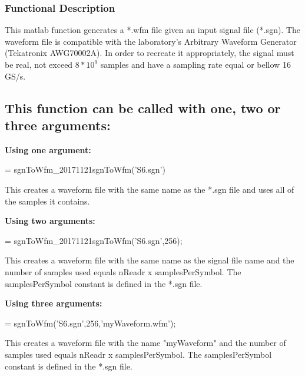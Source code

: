\subsubsection*{Functional Description}

This matlab function generates a *.wfm file given an input signal file (*.sgn). The waveform file is compatible with the laboratory's Arbitrary Waveform Generator (Tekatronix AWG70002A). In order to recreate it appropriately, the signal must be real, not exceed $8*10^9$ samples and have a sampling rate equal or bellow 16 GS/s.


\subsection*{This function can be called with one, two or three arguments:}
\textbf{Using one argument:}
\bigskip

  = sgnToWfm\_20171121sgnToWfm('S6.sgn')
\bigskip

\noindent
This creates a waveform file with the same name as the *.sgn file and uses all of the samples it contains.
\bigskip

\noindent
\textbf{Using two arguments:}
\bigskip

  = sgnToWfm\_20171121sgnToWfm('S6.sgn',256);
\bigskip

\noindent
This creates a waveform file with the same name as the signal file name and the number of samples used equals nReadr x samplesPerSymbol. The samplesPerSymbol constant is defined in the *.sgn file.
\bigskip

\noindent
\textbf{Using three arguments:}
\bigskip

 = sgnToWfm('S6.sgn',256,'myWaveform.wfm');
\bigskip

\noindent
This creates a waveform file with the name "myWaveform" and the number of samples used equals nReadr x samplesPerSymbol. The samplesPerSymbol constant is defined in the *.sgn file.


